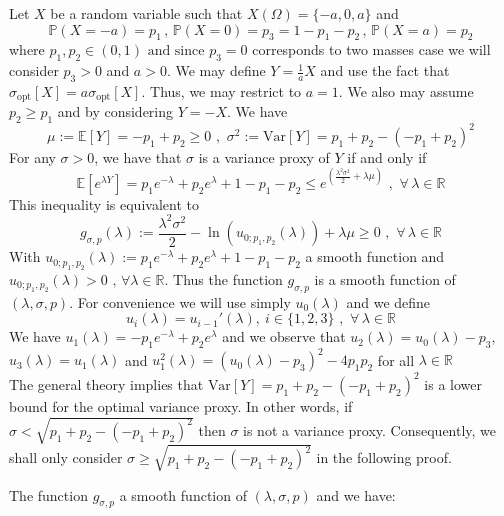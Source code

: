 \documentclass[a4paper, 10pt]{article}
\renewcommand{\P}{\mathbb{P}}
\newcommand{\E}{\mathbb{E}}
\newcommand{\beq}{\begin{equation}}
\newcommand{\eeq}{\end{equation}}
\theoremstyle{definition}
\begin{document}
Let $X$ be a random variable such that $X(\Omega)=\{-a,0,a\}$ and 
\begin{equation}
    \P(X=-a)=p_1\,,\, \P(X=0)=p_3 = 1-p_1-p_2\,,\, \P(X=a)=p_2
\end{equation}
where $p_1, p_2\in \left( 0,1\right) \text{ and since } p_3=0$ corresponds to two masses case  we will consider $p_3 > 0$ and $a>0$. We may define $Y=\frac{1}{a}X$ and use the fact that $\sigma_{\text{opt}}[X]=a \sigma_{\text{opt}}[X]$. Thus, we may restrict to $a=1$. We also may assume $p_2 \geq p_1$ and by considering $Y=-X$. We have
\beq \mu:=\E[Y]=-p_1+p_2 \geq 0\,\,,\,\, \sigma^2:=\text{Var}[Y]=p_1+p_2-(-p_1+p_2)^2\eeq
For any $\sigma>0$, we have that $\sigma$ is a variance proxy of $Y$ if and only if
\beq \E\left[e^{\lambda Y}\right]=p_1 e^{-\lambda }+ p_2e^{\lambda } +1-p_1-p_2\leq e^{(\frac{\lambda^2\sigma^2}{2}+\lambda \mu)} \,\, ,\,\, \forall \, \lambda\in \mathbb{R}\eeq
This inequality is equivalent to
\beq g_{\sigma,p}(\lambda):=\frac{\lambda^2\sigma^2}{2}-\ln(u_{0;p_1, p_2}(\lambda))+\lambda \mu \geq 0 \,\,,\,\,  \forall \, \lambda\in \mathbb{R}\eeq
With  $u_{0;p_1, p_2}(\lambda) := p_1e^{-\lambda}+p_2e^{\lambda}+1-p_1-p_2$ a smooth function and  $u_{0;p_1, p_2}(\lambda) > 0 \text{ , } \forall \lambda \in \mathbb{R}$. Thus the function $g_{\sigma,p}$ is a smooth function of $(\lambda,\sigma,p)$. For convenience we will use simply $u_0(\lambda)$ and we define
\beq u_{i}(\lambda)=u_{i-1}'(\lambda),   \  i  \in \{1,2,3\} \,\,,\,\,  \forall \, \lambda\in \mathbb{R}\eeq
We have $u_1(\lambda) = - p_1e^{-\lambda} + p_2e^{\lambda}$ and we observe that $u_2(\lambda) = u_0(\lambda)-p_3$, $u_3(\lambda) = u_1(\lambda)$ and $u_1^2(\lambda)=(u_0(\lambda)-p_3)^2-4p_1p_2$ for all $\lambda \in \mathbb{R}$ \\
The general theory implies that $\text{Var}[Y]=p_1+p_2-(-p_1+p_2)^2$ is a lower bound for the optimal variance proxy. In other words, if $\sigma<\sqrt{p_1+p_2-(-p_1+p_2)^2}$ then $\sigma$ is not a variance proxy. Consequently, we shall only consider $\sigma \geq\sqrt{p_1+p_2-(-p_1+p_2)^2}$ in the following proof.

The function $g_{\sigma,p}$ a smooth function of $(\lambda,\sigma,p)$ and we have:
\end{document}
